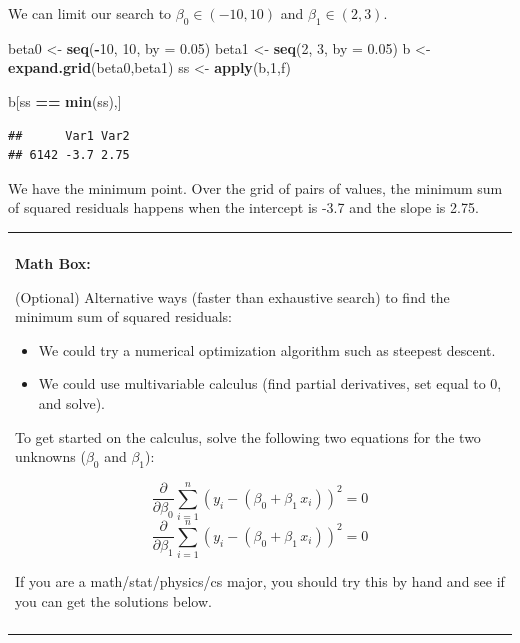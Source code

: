 \documentclass[
]{book}
\newenvironment{Shaded}{\begin{snugshade}}{\end{snugshade}}
\newcommand{\AttributeTok}[1]{\textcolor[rgb]{0.13,0.29,0.53}{#1}}
\newcommand{\DecValTok}[1]{\textcolor[rgb]{0.00,0.00,0.81}{#1}}
\newcommand{\FloatTok}[1]{\textcolor[rgb]{0.00,0.00,0.81}{#1}}
\newcommand{\FunctionTok}[1]{\textcolor[rgb]{0.13,0.29,0.53}{\textbf{#1}}}
\newcommand{\NormalTok}[1]{#1}
\newcommand{\OtherTok}[1]{\textcolor[rgb]{0.56,0.35,0.01}{#1}}
\newcommand{\SpecialCharTok}[1]{\textcolor[rgb]{0.81,0.36,0.00}{\textbf{#1}}}
\providecommand{\tightlist}{%
  \setlength{\itemsep}{0pt}\setlength{\parskip}{0pt}}
\newenvironment{mathbox}
{
    \begin{center}
    
    \begin{tabular}{|p{0.8\textwidth}|}
    \rowcolor{LightYellow}
    \hline\\
    \rowcolor{LightYellow}
    \textbf{Math Box:}
}
{
    \\\rowcolor{LightYellow}
    \\\hline
    \end{tabular} 
    \end{center}
}
\begin{document}
We can limit our search to \(\beta_0 \in (-10,10)\) and \(\beta_1 \in (2,3)\).

\begin{Shaded}
\begin{Highlighting}[]
\NormalTok{beta0 }\OtherTok{\textless{}{-}} \FunctionTok{seq}\NormalTok{(}\SpecialCharTok{{-}}\DecValTok{10}\NormalTok{, }\DecValTok{10}\NormalTok{, }\AttributeTok{by =} \FloatTok{0.05}\NormalTok{)}
\NormalTok{beta1 }\OtherTok{\textless{}{-}} \FunctionTok{seq}\NormalTok{(}\DecValTok{2}\NormalTok{, }\DecValTok{3}\NormalTok{, }\AttributeTok{by =} \FloatTok{0.05}\NormalTok{)}
\NormalTok{b }\OtherTok{\textless{}{-}} \FunctionTok{expand.grid}\NormalTok{(beta0,beta1)}
\NormalTok{ss }\OtherTok{\textless{}{-}} \FunctionTok{apply}\NormalTok{(b,}\DecValTok{1}\NormalTok{,f)}

\NormalTok{b[ss }\SpecialCharTok{==} \FunctionTok{min}\NormalTok{(ss),]}
\end{Highlighting}
\end{Shaded}

\begin{verbatim}
##      Var1 Var2
## 6142 -3.7 2.75
\end{verbatim}

We have the minimum point. Over the grid of pairs of values, the minimum sum of squared residuals happens when the intercept is -3.7 and the slope is 2.75.

\begin{mathbox}
(Optional) Alternative ways (faster than exhaustive search) to find the
minimum sum of squared residuals:

\begin{itemize}
\tightlist
\item
  We could try a numerical optimization algorithm such as steepest
  descent.
\item
  We could use multivariable calculus (find partial derivatives, set
  equal to 0, and solve).
\end{itemize}

To get started on the calculus, solve the following two equations for
the two unknowns (\(\beta_0\) and \(\beta_1\)):

\[\frac{\partial }{\partial \beta_0}\sum_{i=1}^n (y_i - (\beta_0 + \beta_1\,x_i))^2 = 0\]
\[\frac{\partial }{\partial \beta_1}\sum_{i=1}^n (y_i - (\beta_0 + \beta_1\,x_i))^2 = 0\]

If you are a math/stat/physics/cs major, you should try this by hand and
see if you can get the solutions below.
\end{mathbox}
\end{document}
